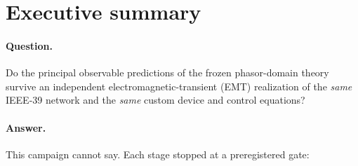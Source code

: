 \documentclass[10pt,a4paper]{article}
\begin{document}
\tableofcontents

\section{Executive summary}

\paragraph{Question.} Do the principal observable predictions of the frozen
phasor-domain theory survive an independent electromagnetic-transient (EMT)
realization of the \emph{same} IEEE-39 network and the \emph{same} custom
device and control equations?

\paragraph{Answer.} This campaign cannot say. Each stage stopped at a
preregistered gate:
\end{document}

